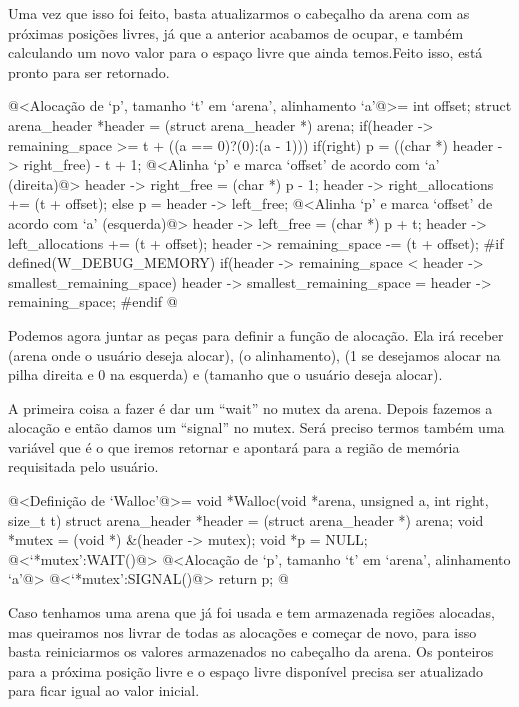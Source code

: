 Uma vez que isso foi feito, basta atualizarmos o cabeçalho da arena
com as próximas posições livres, já que a anterior acabamos de ocupar,
e também calculando um novo valor para o espaço livre que ainda
temos.Feito isso,
 está pronto para ser retornado.

\iniciocodigo
@<Alocação de `p', tamanho `t' em `arena', alinhamento `a'@>=
{
  int offset;
  struct arena_header *header = (struct arena_header *) arena;
  if(header -> remaining_space >= t + ((a == 0)?(0):(a - 1))){
    if(right){
      p = ((char *) header -> right_free) - t + 1;
      @<Alinha `p' e marca `offset' de acordo com `a' (direita)@>
      header -> right_free = (char *) p - 1;
      header -> right_allocations += (t + offset);
    }
    else{
      p = header -> left_free;
      @<Alinha `p' e marca `offset' de acordo com `a' (esquerda)@>
      header -> left_free = (char *) p + t;
      header -> left_allocations += (t + offset);
    }
    header -> remaining_space -= (t + offset);
#if defined(W_DEBUG_MEMORY)
    if(header -> remaining_space < header -> smallest_remaining_space)
      header -> smallest_remaining_space = header -> remaining_space;
#endif
  }
}
@
\fimcodigo


Podemos agora juntar as peças para definir a função de alocação. Ela
irá receber  (arena onde o usuário deseja alocar),
 (o alinhamento),  (1 se desejamos
alocar na pilha direita e 0 na esquerda) e  (tamanho que
o usuário deseja alocar).

A primeira coisa a fazer é dar um ``wait'' no mutex da arena. Depois
fazemos a alocação e então damos um ``signal'' no mutex. Será preciso
termos também uma variável  que é o que iremos retornar
e apontará para a região de memória requisitada pelo usuário.


\iniciocodigo
@<Definição de `Walloc'@>=
void *Walloc(void *arena, unsigned a, int right, size_t t){
  struct arena_header *header = (struct arena_header *) arena;
  void *mutex = (void *) &(header -> mutex);
  void *p = NULL;
  @<`*mutex':WAIT()@>
  @<Alocação de `p', tamanho `t' em `arena', alinhamento `a'@>
  @<`*mutex':SIGNAL()@>
  return p;
}
@
\fimcodigo


Caso tenhamos uma arena que já foi usada e tem armazenada regiões
alocadas, mas queiramos nos livrar de todas as alocações e começar de
novo, para isso basta reiniciarmos os valores armazenados no cabeçalho
da arena. Os ponteiros para a próxima posição livre e o espaço livre
disponível precisa ser atualizado para ficar igual ao valor inicial.

